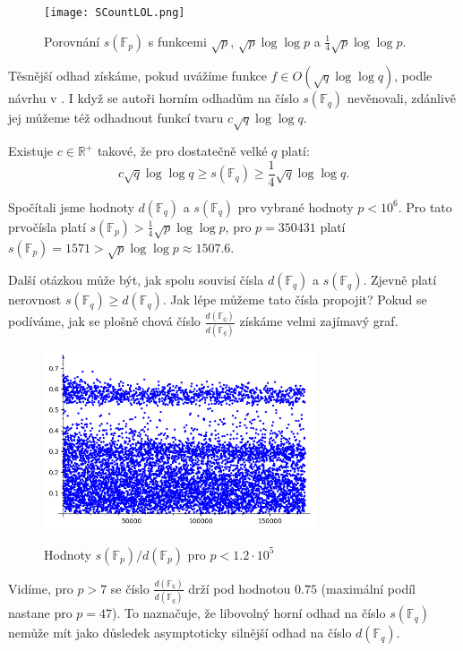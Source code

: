 \documentclass[12pt]{report}
\begin{document}
\begin{figure}[h]
\centering
  \texttt{[image: SCountLOL.png]}
  \label{fig:boat1}
\caption{Porovnání $s(\mathbb{F}_p)$ s funkcemi $\sqrt{p}$, $\sqrt{p} \log \log p$ a $\frac{1}{4} \sqrt{p} \log \log p$.}
\end{figure}

Těsnější odhad získáme, pokud uvážíme funkce $f \in O(\sqrt{q} \log \log q)$, podle návrhu v \cite{Meduza}. I když se autoři horním odhadům na číslo $s(\mathbb{F}_q)$ nevěnovali, zdánlivě jej můžeme též odhadnout funkcí tvaru $c \sqrt{q} \log \log q$.
\begin{domnenka}\label{dd}
Existuje $c \in \mathbb{R}^{+}$ takové, že pro dostatečně velké $q$ platí:
$$c \sqrt{q} \log \log q \geqslant s(\mathbb{F}_q) \geqslant \frac{1}{4} \sqrt{q} \log \log q.$$
\end{domnenka}

Spočítali jsme hodnoty $d(\mathbb{F}_q)$ a $s(\mathbb{F}_q)$ pro vybrané hodnoty $p < 10^6$. Pro tato prvočísla platí $s(\mathbb{F}_p) > \frac{1}{4} \sqrt{p} \log \log p$, pro $p=350431$ platí $s(\mathbb{F}_p) = 1571 > \sqrt{p} \log \log p \approx 1507.6$.

Další otázkou může být, jak spolu souvisí čísla $d(\mathbb{F}_q)$ a $s(\mathbb{F}_q)$. Zjevně platí nerovnost $s(\mathbb{F}_q) \geqslant d(\mathbb{F}_q)$. Jak lépe můžeme tato čísla propojit? Pokud se podíváme, jak se plošně chová číslo $\frac{d(\mathbb{F_q})}{d(\mathbb{F}_q)}$ získáme velmi zajímavý graf.\


\begin{figure}[h]
\centering
  \includegraphics[width=8cm]{Podil.png}
  \label{fig}
  \caption{Hodnoty $s(\mathbb{F}_p)/d(\mathbb{F}_p)$ pro $p < 1.2 \cdot 10^5$}
\end{figure}


Vidíme, pro $p>7$ se číslo $\frac{d(\mathbb{F_q})}{d(\mathbb{F}_q)}$ drží pod hodnotou $0.75$ (maximální podíl nastane pro $p=47$). To naznačuje, že libovolný horní odhad na číslo $s(\mathbb{F}_q)$ nemůže mít jako důsledek asymptoticky silnější odhad na číslo $d(\mathbb{F}_q)$.  
\end{document}
